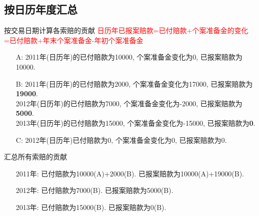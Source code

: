 \documentclass[professionalfont]{beamer}
\newcommand{\red}[1]{\textcolor{red}{#1}}
\newcommand{\green}[1]{\textbf{#1}}
\begin{document}
\subsection{按日历年度汇总}
\begin{frame}{按交易日期计算各索赔的贡献}
	\red{日历年已报案赔款=已付赔款+个案准备金的变化\\=已付赔款+年末个案准备金-年初个案准备金}
\begin{itemize}
\item[A:]2011年(日历年)的已付赔款为10000, 个案准备金变化为0, 已报案赔款为10000. 
\item[B:]2011年(日历年)的已付赔款为2000, 个案准备金变化为17000, 已报案赔款为\green{19000}.\\
 2012年(日历年)的已付赔款为7000, 个案准备金变化为-2000, 已报案赔款为\green{5000}. \\
 2013年(日历年)的已付赔款为15000, 个案准备金变化为-15000, 已报案赔款为\green{0}.
\item[C:]2012年(日历年)已付赔款为0, 个案准备金变化为0, 已报案赔款为0.

\end{itemize}
\end{frame}
\begin{frame}{汇总所有索赔的贡献}
	\begin{itemize}
		\item[2011年:]已付赔款为10000(A)+2000(B). 已报案赔款为10000(A)+19000(B). 
		\item[2012年:]已付赔款为7000(B). 已报案赔款为5000(B).\\
		\item[2013年:]已付赔款为15000(B). 已报案赔款为0(B).
	\end{itemize}
\end{frame}
\end{document}
